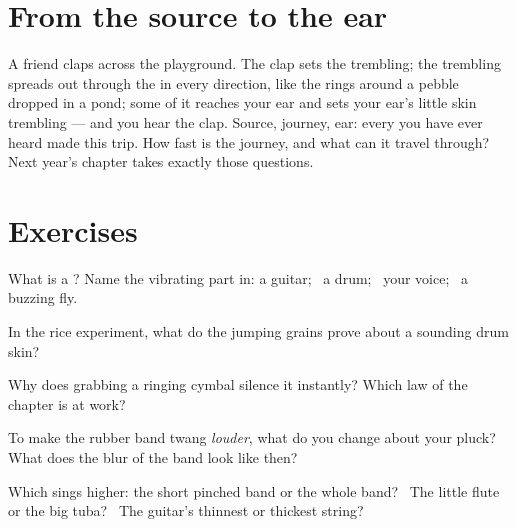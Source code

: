 \section{From the source to the ear}

\begin{example}\label{ex:g3:sound-around-us:journey}
A friend claps across the playground. The clap sets the 
trembling; the trembling spreads out through the  in every
direction, like the rings around a pebble dropped in a pond; some of
it reaches your ear and sets your ear's little skin trembling ---
and you hear the clap. Source, journey, ear: every  you have
ever heard made this trip. How fast is the journey, and what can it
travel through? Next year's  chapter takes exactly those
questions.
\end{example}

\section{Exercises}

\begin{exercise}[$\star$]\label{exo:g3:sound-around-us:1}
What is a ? Name the vibrating part in: a guitar; \ a drum;
\ your voice; \ a buzzing fly.
\end{exercise}

\begin{exercise}[$\star$]\label{exo:g3:sound-around-us:2}
In the rice experiment, what do the jumping grains prove about a
sounding drum skin?
\end{exercise}

\begin{exercise}[$\star$]\label{exo:g3:sound-around-us:3}
Why does grabbing a ringing cymbal silence it instantly? Which law
of the chapter is at work?
\end{exercise}

\begin{exercise}[$\star$]\label{exo:g3:sound-around-us:4}
To make the rubber band twang \emph{louder}, what do you change
about your pluck? What does the blur of the band look like then?
\end{exercise}

\begin{exercise}[$\star$]\label{exo:g3:sound-around-us:5}
Which sings higher: the short pinched band or the whole band? \ The
little flute or the big tuba? \ The guitar's thinnest or thickest
string?
\end{exercise}

